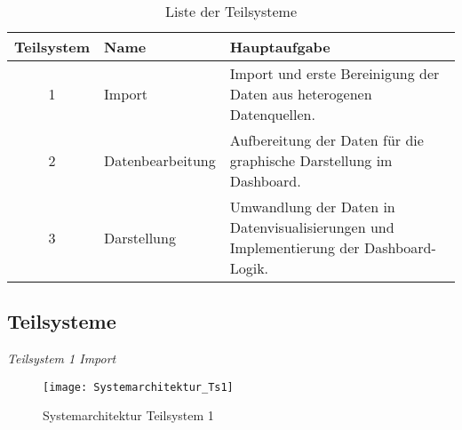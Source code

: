        \begingroup
            \setlength{\tabcolsep}{4pt} %
            \renewcommand{\arraystretch}{1.5}
            \begin{table}[h]
                \centering
                \begin{adjustbox}{max width=\textwidth}
                \Huge
                \begin{tabular}{cll}
                   \toprule
                   \textbf{Teilsystem}             & Name   &{Hauptaufgabe} \\
                   \midrule     
                            1                      &Import  &Import und erste Bereinigung der Daten aus heterogenen Datenquellen.\\
                            2                      &Datenbearbeitung     &Aufbereitung der Daten für die graphische Darstellung im Dashboard.\\
                            3                      &Darstellung          &Umwandlung der Daten in Datenvisualisierungen und Implementierung der Dashboard-Logik.\\

                    \bottomrule
                \end{tabular}
                \end{adjustbox}
                \caption{%
                    Liste der Teilsysteme
                \label{tab:Teilsysteme}
                }
                 \end{table}
            \endgroup

    \subsection{Teilsysteme}
    \label{chap:five_one_three}
    
    \clearpage
    \textit{Teilsystem 1 Import}\\
    \begin{figure}[H]
        \centering
            \texttt{[image: Systemarchitektur\_Ts1]}
            \caption{Systemarchitektur Teilsystem 1}
            \label{fig:Systemarchitektur Teilsystem 1}
    \end{figure}


